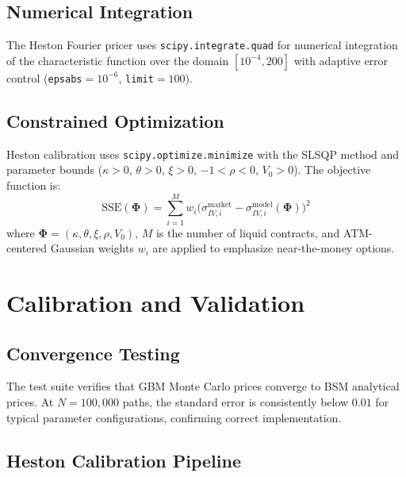\documentclass[12pt,a4paper]{article}
\begin{document}
\subsection{Numerical Integration}

The Heston Fourier pricer uses \texttt{scipy.integrate.quad} for numerical integration of the characteristic function over the domain $[10^{-4}, 200]$ with adaptive error control (\texttt{epsabs}$=10^{-6}$, \texttt{limit}$=100$).

\subsection{Constrained Optimization}

Heston calibration uses \texttt{scipy.optimize.minimize} with the SLSQP method and parameter bounds ($\kappa > 0$, $\theta > 0$, $\xi > 0$, $-1 < \rho < 0$, $V_0 > 0$). The objective function is:
\begin{equation}
\label{eq:calib-sse}
\text{SSE}(\boldsymbol{\Phi}) = \sum_{i=1}^{M} w_i \bigl(\sigma_{IV,i}^{\text{market}} - \sigma_{IV,i}^{\text{model}}(\boldsymbol{\Phi})\bigr)^2
\end{equation}
where $\boldsymbol{\Phi} = (\kappa, \theta, \xi, \rho, V_0)$, $M$ is the number of liquid contracts, and ATM-centered Gaussian weights $w_i$ are applied to emphasize near-the-money options.

\section{Calibration and Validation}

\subsection{Convergence Testing}

The test suite verifies that GBM Monte Carlo prices converge to BSM analytical prices. At $N = 100{,}000$ paths, the standard error is consistently below $0.01$ for typical parameter configurations, confirming correct implementation.

\subsection{Heston Calibration Pipeline}
\end{document}
